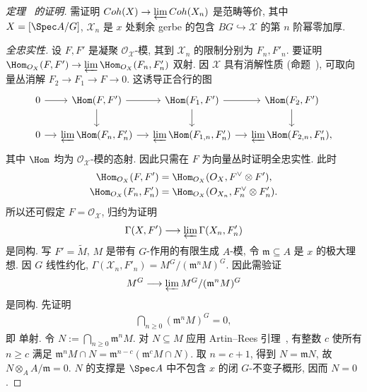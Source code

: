 \begin{proof}[定理~ 的证明]
需证明 $\mathsf{Coh}(\mathcal X)\to\varprojlim\mathsf{Coh}(\mathcal X_n)$ 是范畴等价, 其中 $\mathcal X=[\Spec A/G]$, $\mathcal X_n$ 是 $x$ 处剩余 gerbe 的包含 $BG\hookrightarrow\mathcal X$ 的第 $n$ 阶幂零加厚.

\emph{全忠实性.} 设 $F,F'$ 是凝聚 $\mathcal O_{\mathcal X}$-模, 其到 $\mathcal X_n$ 的限制分别为 $F_n,F'_n$. 要证明 $\Hom_{\mathcal O_{\mathcal X}}(F,F')\to\varprojlim\Hom_{\mathcal O_{\mathcal X}}(F_n,F'_n)$ 双射. 因 $\mathcal X$ 具有消解性质 (命题~), 可取向量丛消解 $F_2\to F_1\to F\to0$. 这诱导正合行的图
\begin{align*}
\begin{tikzcd}[ampersand replacement=\&,column sep=small]
0\arrow[r]\&\Hom(F,F')\arrow[r]\arrow[d]\&\Hom(F_1,F')\arrow[r]\arrow[d]\&\Hom(F_2,F')\arrow[d]\\
0\arrow[r]\&\varprojlim\Hom(F_n,F'_n)\arrow[r]\&\varprojlim\Hom(F_{1,n},F'_n)\arrow[r]\&\varprojlim\Hom(F_{2,n},F'_n),
\end{tikzcd}
\end{align*}
其中 $\Hom$ 均为 $\mathcal O_{\mathcal X}$-模的态射. 因此只需在 $F$ 为向量丛时证明全忠实性. 此时
\begin{align*}
\Hom_{\mathcal O_{\mathcal X}}(F,F')&=\Hom_{\mathcal O_{\mathcal X}}(\mathcal O_{\mathcal X},F^\vee\otimes F'),\\
\Hom_{\mathcal O_{\mathcal X}}(F_n,F'_n)&=\Hom_{\mathcal O_{\mathcal X}}(\mathcal O_{\mathcal X_n},F_n^\vee\otimes F'_n).
\end{align*}
所以还可假定 $F=\mathcal O_{\mathcal X}$, 归约为证明
\begin{align}\label{src:7.6.16}
\Gamma(\mathcal X,F')\longrightarrow\varprojlim\Gamma(\mathcal X_n,F'_n)
\end{align}
是同构. 写 $F'=\widetilde M$, $M$ 是带有 $G$-作用的有限生成 $A$-模, 令 $\mathfrak m\subseteq A$ 是 $x$ 的极大理想. 因 $G$ 线性约化, $\Gamma(\mathcal X_n,F'_n)=M^G/(\mathfrak m^nM)^G$. 因此需验证
\begin{align}\label{src:7.6.17}
M^G\longrightarrow\varprojlim M^G/(\mathfrak m^nM)^G
\end{align}
是同构. 先证明
\begin{align}\label{src:7.6.18}
\bigcap_{n\ge0}(\mathfrak m^nM)^G=0,
\end{align}
即  单射. 令 $N:=\bigcap_{n\ge0}\mathfrak m^nM$. 对 $N\subseteq M$ 应用 Artin--Rees 引理~, 有整数 $c$ 使所有 $n\ge c$ 满足 $\mathfrak m^nM\cap N=\mathfrak m^{n-c}(\mathfrak m^cM\cap N)$. 取 $n=c+1$, 得到 $N=\mathfrak mN$, 故 $N\otimes_AA/\mathfrak m=0$. $N$ 的支撑是 $\Spec A$ 中不包含 $x$ 的闭 $G$-不变子概形, 因而 $N=0$.


\end{proof}
